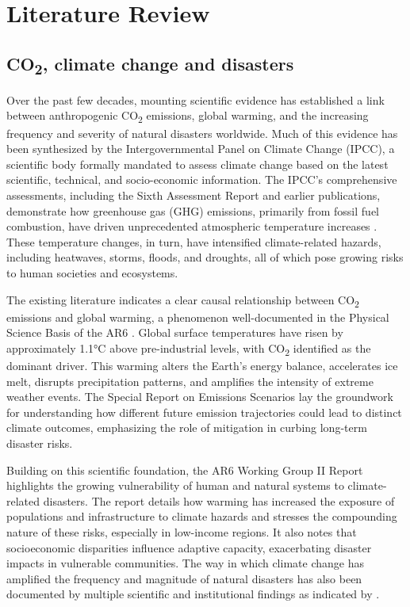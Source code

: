 
\section{Literature Review}
\label{sec:literature_review}

\subsection{CO\textsubscript{2}, climate change and disasters}

Over the past few decades, mounting scientific evidence has established a link between anthropogenic CO\textsubscript{2} emissions, global warming, and the increasing frequency and severity of natural disasters worldwide. Much of this evidence has been synthesized by the Intergovernmental Panel on Climate Change (IPCC), a scientific body formally mandated to assess climate change based on the latest scientific, technical, and socio-economic information. The IPCC's comprehensive assessments, including the Sixth Assessment Report \citet{ipcc_ar6} and earlier publications, demonstrate how greenhouse gas (GHG) emissions, primarily from fossil fuel combustion, have driven unprecedented atmospheric temperature increases \citep{IPCC_AR6_WGI_2021, IPCC_AR6_WGII_2022, IPCC_AR6_WGIII_2022}. These temperature changes, in turn, have intensified climate-related hazards, including heatwaves, storms, floods, and droughts, all of which pose growing risks to human societies and ecosystems.

The existing literature indicates a clear causal relationship between CO\textsubscript{2} emissions and global warming, a phenomenon well-documented in the Physical Science Basis of the AR6 \citep{IPCC_AR6_WGI_2021}. Global surface temperatures have risen by approximately 1.1°C above pre-industrial levels, with CO\textsubscript{2} identified as the dominant driver. This warming alters the Earth's energy balance, accelerates ice melt, disrupts precipitation patterns, and amplifies the intensity of extreme weather events. The Special Report on Emissions Scenarios \citep{ipcc} lay the groundwork for understanding how different future emission trajectories could lead to distinct climate outcomes, emphasizing the role of mitigation in curbing long-term disaster risks.

Building on this scientific foundation, the AR6 Working Group II Report \citep{IPCC_AR6_WGII_2022} highlights the growing vulnerability of human and natural systems to climate-related disasters. The report details how warming has increased the exposure of populations and infrastructure to climate hazards and stresses the compounding nature of these risks, especially in low-income regions. It also notes that socioeconomic disparities influence adaptive capacity, exacerbating disaster impacts in vulnerable communities. The way in which climate change has amplified the frequency and magnitude of natural disasters has also been documented by multiple scientific and institutional findings as indicated by \citet{vanaalst2006impacts}.

